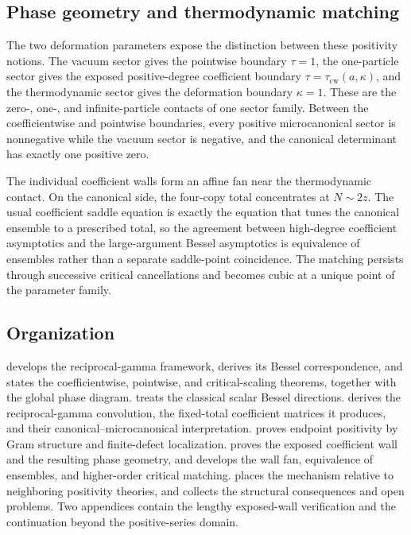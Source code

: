 \documentclass[11pt,a4paper]{amsart}
\numberwithin{equation}{section}
\theoremstyle{plain}
\theoremstyle{definition}
\begin{document}
\subsection{Phase geometry and thermodynamic matching}\label{subsec:intro-phase}

The two deformation parameters expose the distinction between these positivity
notions.  The vacuum sector gives the pointwise boundary \(\tau=1\), the
one-particle sector gives the exposed positive-degree coefficient boundary
\(\tau=\tau_{\mathrm{cw}}(a,\kappa)\), and the thermodynamic sector gives the
deformation boundary \(\kappa=1\).  These are the zero-, one-, and
infinite-particle contacts of one sector family.  Between the coefficientwise
and pointwise boundaries, every positive microcanonical sector is nonnegative
while the vacuum sector is negative, and the canonical determinant has exactly
one positive zero.

The individual coefficient walls form an affine fan near the thermodynamic
contact.  On the canonical side, the four-copy total concentrates at
\(N\sim2z\).  The usual coefficient saddle equation is exactly the equation
that tunes the canonical ensemble to a prescribed total, so the agreement
between high-degree coefficient asymptotics and the large-argument Bessel
asymptotics is equivalence of ensembles rather than a separate saddle-point
coincidence.  The matching persists through successive critical cancellations
and becomes cubic at a unique point of the parameter family.

\subsection{Organization}\label{subsec:intro-organization}

 develops the reciprocal-gamma framework, derives its Bessel
correspondence, and states the coefficientwise, pointwise, and critical-scaling
theorems, together with the global phase diagram.   treats the
classical scalar Bessel directions.   derives the
reciprocal-gamma convolution, the fixed-total coefficient matrices it
produces, and their canonical--microcanonical interpretation.
 proves endpoint positivity by Gram structure and
finite-defect localization.   proves the exposed
coefficient wall and the resulting phase geometry, and 
develops the wall fan, equivalence of ensembles, and higher-order critical
matching.   places the mechanism relative to neighboring
positivity theories, and  collects the structural
consequences and open problems.  Two appendices contain the lengthy
exposed-wall verification and the continuation beyond the positive-series
domain.
\end{document}
